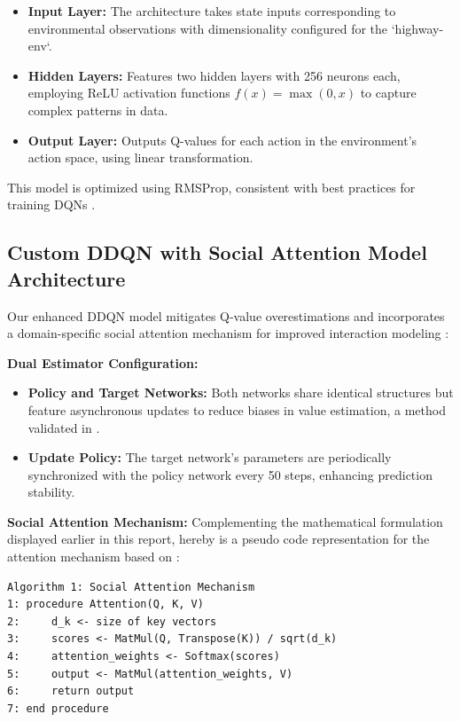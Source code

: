 \documentclass{article}
\begin{document}
\begin{itemize}
    \item \textbf{Input Layer:} The architecture takes state inputs corresponding to environmental observations with dimensionality configured for the `highway-env`.
    \item \textbf{Hidden Layers:} Features two hidden layers with 256 neurons each, employing ReLU activation functions \( f(x) = \max(0, x) \) to capture complex patterns in data.
    \item \textbf{Output Layer:} Outputs Q-values for each action in the environment's action space, using linear transformation.
\end{itemize}

This model is optimized using RMSProp, consistent with best practices for training DQNs \citep{mnih2015humanlevel}.

\subsection{Custom DDQN with Social Attention Model Architecture}
Our enhanced DDQN model mitigates Q-value overestimations and incorporates a domain-specific social attention mechanism for improved interaction modeling \citep{leurent2019social}:

\textbf{Dual Estimator Configuration:}
\begin{itemize}
    \item \textbf{Policy and Target Networks:} Both networks share identical structures but feature asynchronous updates to reduce biases in value estimation, a method validated in \citep{DBLP:journals/corr/HasseltGS15}.
    \item \textbf{Update Policy:} The target network's parameters are periodically synchronized with the policy network every 50 steps, enhancing prediction stability.
\end{itemize}

\textbf{Social Attention Mechanism:}
Complementing the mathematical formulation displayed earlier in this report, hereby is a pseudo code representation for the attention mechanism based on \citep{DBLP:journals/corr/VaswaniSPUJGKP17}:

\begin{verbatim}
Algorithm 1: Social Attention Mechanism
1: procedure Attention(Q, K, V)
2:     d_k <- size of key vectors
3:     scores <- MatMul(Q, Transpose(K)) / sqrt(d_k)
4:     attention_weights <- Softmax(scores)
5:     output <- MatMul(attention_weights, V)
6:     return output
7: end procedure
\end{verbatim}
\end{document}

